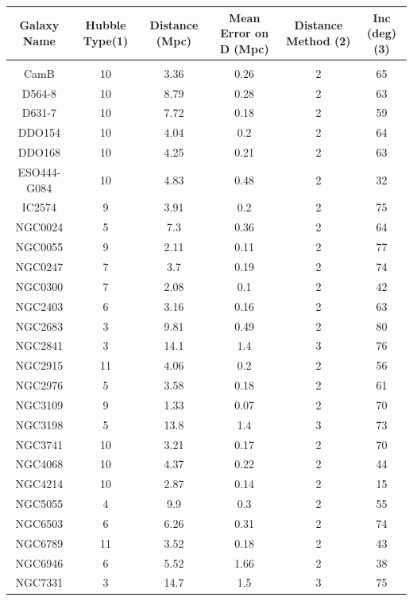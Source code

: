 \documentclass[reprint,%
 amsmath,amssymb,
 aps,
]{revtex4-1}
\begin{document}
 

  \begin{table}[]
      \centering
      \begin{tabular}{|c|c|c|c|c|c|}
      \hline \hline
\rowcolor[HTML]{CCCCCC} 
\textbf{Galaxy Name} & Hubble Type(1)& 	Distance (Mpc)&Mean Error on D (Mpc)& 	Distance Method (2)& 	Inc (deg)(3)\\
    \hline \hline\\
CamB&   	10&    3.36&  	0.26&   2&  65\\
D564-8& 	10& 	8.79& 	0.28& 	2& 	63\\
D631-7& 	10& 	7.72& 	0.18& 	2& 	59\\
DDO154& 	10& 	4.04& 	0.2& 	2& 	64\\
DDO168& 	10& 	4.25& 	0.21& 	2& 	63\\
ESO444-G084& 10& 	4.83& 	0.48& 	2& 	32\\
IC2574& 	9& 	3.91& 	0.2&    	2& 	75\\
NGC0024& 	5& 	7.3& 	0.36&   	2& 	64\\
NGC0055& 	9& 	2.11& 	0.11&   	2& 	77\\
NGC0247& 	7& 	3.7& 	0.19&   	2& 	74\\
NGC0300& 	7& 	2.08& 	0.1&    	2& 	42\\
NGC2403& 	6& 	3.16& 	0.16&   	2& 	63\\
NGC2683& 	3& 	9.81& 	0.49&   	2& 	80\\
NGC2841& 	3& 	14.1& 	1.4&    	3& 	76\\
NGC2915& 	11& 	4.06& 	0.2& 	2& 	56\\
NGC2976& 	5& 	3.58& 	0.18&   	2& 	61\\
NGC3109& 	9& 	1.33& 	0.07&   	2& 	70\\
NGC3198& 	5& 	13.8& 	1.4&    	3& 	73\\
NGC3741& 	10& 	3.21& 	0.17& 	2& 	70\\
NGC4068& 	10& 	4.37& 	0.22& 	2& 	44\\
NGC4214& 	10& 	2.87& 	0.14& 	2& 	15\\
NGC5055& 	4& 	9.9& 	0.3&    	2& 	55\\
NGC6503& 	6& 	6.26& 	0.31&   	2& 	74\\
NGC6789& 	11& 	3.52& 	0.18& 	2& 	43\\
NGC6946& 	6& 	5.52& 	1.66&   	2& 	38\\
NGC7331& 	3& 	14.7& 	1.5&    	3& 	75\\

\end{tabular}
\end{table}
\end{document}
